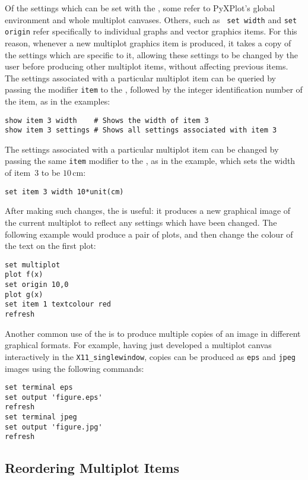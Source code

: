 Of the settings which can be set with the , some refer to
PyXPlot's global environment and whole multiplot canvases. Others, such as {\tt
set width} and {\tt set origin} refer specifically to individual graphs and
vector graphics items. For this reason, whenever a new multiplot graphics item
is produced, it takes a copy of the settings which are specific to it, allowing
these settings to be changed by the user before producing other multiplot
items, without affecting previous items. The settings associated with a
particular multiplot item can be queried by passing the modifier {\tt item} to
the , followed by the integer identification number of the item,
as in the examples:
\begin{verbatim}
show item 3 width    # Shows the width of item 3
show item 3 settings # Shows all settings associated with item 3
\end{verbatim}

The settings associated with a particular multiplot item can be changed by
passing the same {\tt item} modifier to the , as in the example,
which sets the width of item~3 to be $10\,\mathrm{cm}$:
\begin{verbatim}
set item 3 width 10*unit(cm)
\end{verbatim}
After making such changes, the  is useful: it produces a new
graphical image of the current multiplot to reflect any settings which have
been changed. The following example would produce a pair of plots, and then
change the colour of the text on the first plot:
\begin{verbatim}
set multiplot
plot f(x)
set origin 10,0
plot g(x)
set item 1 textcolour red
refresh
\end{verbatim}

Another common use of the  is to produce multiple
copies of an image in different graphical formats. For example, having just
developed a multiplot canvas interactively in the {\tt X11\_singlewindow},
copies can be produced as {\tt eps} and {\tt jpeg} images using the following
commands:
\begin{verbatim}
set terminal eps
set output 'figure.eps'
refresh
set terminal jpeg
set output 'figure.jpg'
refresh
\end{verbatim}

\subsection{Reordering Multiplot Items}


